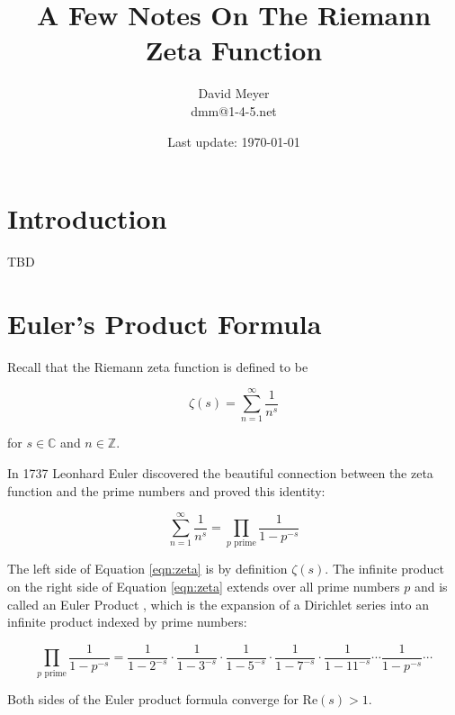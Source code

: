 \documentclass[11pt, oneside]{article}   	%
\title{A Few Notes On The Riemann Zeta Function}
\author{David Meyer \\ dmm@1-4-5.net}
\date{Last update: \today}							%
\theoremstyle{definition}
\begin{document}
\maketitle

\section{Introduction}
TBD

\section{Euler's Product Formula}
Recall that the Riemann zeta function is defined to be

\medskip
\begin{equation*}
\zeta(s) = \sum^\infty_{n = 1} \frac{1}{n^s}
\end{equation*}

\noindent
for $s \in \mathbb{C}$ and $n \in \mathbb{Z}$.

\bigskip
\noindent
In 1737 Leonhard Euler \cite{euler_product_formula} discovered the beautiful connection between the zeta function and the prime numbers and proved this identity:

\medskip
\begin{equation}
\sum^\infty_{n = 1} \frac{1}{n^s} = \prod_{\text{$p$ prime}} \!  \frac{1}{1 - p^{-s}}
\label{eqn:zeta}
\end{equation}

\bigskip
\noindent
The left side of Equation \ref{eqn:zeta} is by definition $\zeta(s)$. The infinite product on the right side of Equation \ref{eqn:zeta}  extends over all prime numbers $p$ and is called an Euler 
Product \cite{euler_product}, which is the expansion of a Dirichlet series \cite{mccarthy2018} into an infinite product indexed by prime numbers:

\begin{equation*}
\prod_{\text{$p$ prime}} \!  \frac{1}{1 - p^{-s}} = \frac{1}{1 - 2^{-s}} \cdot \frac{1}{1 - 3^{-s}} \cdot  \frac{1}{1 - 5^{-s}} \cdot  \frac{1}{1 - 7^{-s}} \cdot  \frac{1}{1 - 11^{-s}} \cdots  \frac{1}{1 - p^{-s}} \cdots
\end{equation*}

\bigskip
\noindent
Both sides of the Euler product formula converge for $\text{Re}(s) > 1$.




\end{document}
